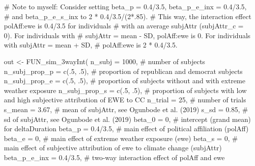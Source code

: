\documentclass[
  letterpaper,
  DIV=11,
  numbers=noendperiod]{scrartcl}
\newenvironment{Shaded}{\begin{snugshade}}{\end{snugshade}}
\newcommand{\AttributeTok}[1]{\textcolor[rgb]{0.40,0.45,0.13}{#1}}
\newcommand{\CommentTok}[1]{\textcolor[rgb]{0.37,0.37,0.37}{#1}}
\newcommand{\DecValTok}[1]{\textcolor[rgb]{0.68,0.00,0.00}{#1}}
\newcommand{\FloatTok}[1]{\textcolor[rgb]{0.68,0.00,0.00}{#1}}
\newcommand{\FunctionTok}[1]{\textcolor[rgb]{0.28,0.35,0.67}{#1}}
\newcommand{\NormalTok}[1]{\textcolor[rgb]{0.00,0.23,0.31}{#1}}
\newcommand{\OtherTok}[1]{\textcolor[rgb]{0.00,0.23,0.31}{#1}}
\newcommand{\SpecialCharTok}[1]{\textcolor[rgb]{0.37,0.37,0.37}{#1}}
\begin{document}
\begin{Shaded}
\begin{Highlighting}[]
\CommentTok{\# Note to myself: Consider setting beta\_p = 0.4/3.5, beta\_p\_e\_inx = 0.4/3.5,}
\CommentTok{\# and beta\_p\_e\_s\_inx to 2 * 0.4/3.5/(2*.85).}
\CommentTok{\# This way, the interaction effect polAff:ewe is 0.4/3.5 for individuals}
\CommentTok{\# with an average subjAttr (subjAttr\_c = 0). For individuals with}
\CommentTok{\# subjAttr = mean {-} SD, polAff:ewe is 0. For individuals with subjAttr = mean + SD,}
\CommentTok{\# polAff:ewe is  2 * 0.4/3.5.}

\NormalTok{out }\OtherTok{\textless{}{-}} \FunctionTok{FUN\_sim\_3wayInt}\NormalTok{(}
  \AttributeTok{n\_subj         =}                \DecValTok{1000}\NormalTok{, }\CommentTok{\# number of subjects}
  \AttributeTok{n\_subj\_prop\_p  =}           \FunctionTok{c}\NormalTok{(.}\DecValTok{5}\NormalTok{, .}\DecValTok{5}\NormalTok{), }\CommentTok{\# proportion of republican and democrat subjects}
  \AttributeTok{n\_subj\_prop\_e  =}           \FunctionTok{c}\NormalTok{(.}\DecValTok{5}\NormalTok{, .}\DecValTok{5}\NormalTok{), }\CommentTok{\# proportion of subjects without and with extreme weather exposure}
  \AttributeTok{n\_subj\_prop\_s  =}           \FunctionTok{c}\NormalTok{(.}\DecValTok{5}\NormalTok{, .}\DecValTok{5}\NormalTok{), }\CommentTok{\# proportion of subjects with low and high subjective attribution of EWE to CC}
  \AttributeTok{n\_trial        =}                  \DecValTok{25}\NormalTok{, }\CommentTok{\# number of trials}
  \AttributeTok{s\_mean         =}                \FloatTok{3.67}\NormalTok{, }\CommentTok{\# mean of subjAttr, see Ogunbode et al. (2019)}
  \AttributeTok{s\_sd           =}                \FloatTok{0.85}\NormalTok{, }\CommentTok{\# sd of subjAttr, see Ogunbode et al. (2019)}
  \AttributeTok{beta\_0         =}                   \DecValTok{0}\NormalTok{, }\CommentTok{\# intercept (grand mean) for deltaDuration}
  \AttributeTok{beta\_p         =}             \FloatTok{0.4}\SpecialCharTok{/}\FloatTok{3.5}\NormalTok{, }\CommentTok{\# main effect of political affiliation (polAff)}
  \AttributeTok{beta\_e         =}                   \DecValTok{0}\NormalTok{, }\CommentTok{\# main effect of extreme weather exposure (ewe)}
  \AttributeTok{beta\_s         =}                   \DecValTok{0}\NormalTok{, }\CommentTok{\# main effect of subjective attribution of ewe to climate change (subjAttr)}
  \AttributeTok{beta\_p\_e\_inx   =}             \FloatTok{0.4}\SpecialCharTok{/}\FloatTok{3.5}\NormalTok{, }\CommentTok{\# two{-}way interaction effect of polAff and ewe}

\end{Highlighting}
\end{Shaded}
\end{document}

